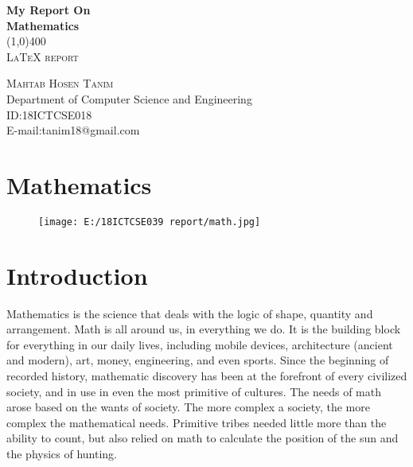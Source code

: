 \documentclass{article}
\begin{document}
\begin{titlepage}
\begin{center}
\huge{\bfseries My Report On}\\
\huge{\bfseries Mathematics}\\
\line(1,0){400}\\
\textsc{\LARGE LaTeX report}\\
\end{center}

\begin{flushright}
\textsc{\LARGE Mahtab Hosen Tanim\\}
Department of Computer Science and Engineering\\
ID:18ICTCSE018\\
E-mail:tanim18@gmail.com\\

\end{flushright}

\end{titlepage}

\tableofcontents
\thispagestyle{empty}
\cleardoublepage


\setcounter{page}{1}
\section{Mathematics}
\begin{figure}[H]
\texttt{[image: E:/18ICTCSE039 report/math.jpg]}
\end{figure}

\section{Introduction}
Mathematics is the science that deals with the logic of shape, quantity and arrangement. Math is all around us, in everything we do. It is the building block for everything in our daily lives, including mobile devices, architecture (ancient and modern), art, money, engineering, and even sports.\newline \newline
Since the beginning of recorded history, mathematic discovery has been at the forefront of every civilized society, and in use in even the most primitive of cultures. The needs of math arose based on the wants of society. The more complex a society, the more complex the mathematical needs. Primitive tribes needed little more than the ability to count, but also relied on math to calculate the position of the sun and the physics of hunting.
\end{document}

